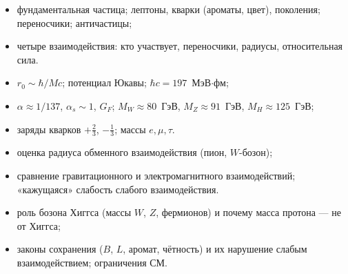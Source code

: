 \begin{examcheck}
\begin{itemize}
 \item фундаментальная частица; лептоны, кварки (ароматы, цвет), поколения; переносчики; античастицы;
 \item четыре взаимодействия: кто участвует, переносчики, радиусы, относительная сила.
\end{itemize}
\begin{itemize}
 \item $r_0\sim\hbar/Mc$; потенциал Юкавы; $\hbar c=197$~МэВ$\cdot$фм;
 \item $\alpha\approx1/137$, $\alpha_s\sim1$, $G_F$; $M_W\approx80$~ГэВ, $M_Z\approx91$~ГэВ, $M_H\approx125$~ГэВ;
 \item заряды кварков $+\frac23$, $-\frac13$; массы $e,\mu,\tau$.
\end{itemize}
\begin{itemize}
 \item оценка радиуса обменного взаимодействия (пион, $W$-бозон);
 \item сравнение гравитационного и электромагнитного взаимодействий; «кажущаяся» слабость слабого взаимодействия.
\end{itemize}
\begin{itemize}
 \item роль бозона Хиггса (массы $W$, $Z$, фермионов) и почему масса протона — не от Хиггса;
 \item законы сохранения ($B$, $L$, аромат, чётность) и их нарушение слабым взаимодействием; ограничения СМ.
\end{itemize}
\end{examcheck}
